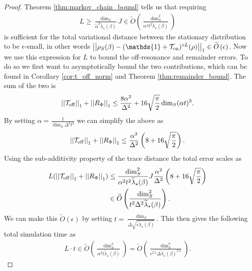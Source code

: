 \documentclass[
 amsmath,amssymb,
 aps,
onecolumn, 
nofootinbib]{revtex4-2}
\newcommand{\on}{\rm on}
\newcommand{\off}{\rm off}
\newcommand{\norm}[1]{\left|\left| #1 \right|\right|}
\newcommand{\TT}{\mathcal{T}}
\newcommand{\bigotilde}[1]{\widetilde{O} \left( #1 \right)}
\newcommand{\identity}{\mathds{1}}
\begin{document}
\begin{proof}
    Theorem \ref{thm:markov_chain_bound} tells us that requiring
    \begin{align}
        L \ge \frac{\dim_S}{\widetilde{\alpha}^2 \widetilde{\lambda}_\star(\beta)} J \in \bigotilde{\frac{\dim_S^2}{\alpha^2 t^2 \widetilde{\lambda}_\star(\beta)}}
    \end{align}
    is sufficient for the total variational distance between the stationary distribution to be $\epsilon$-small, in other words $\norm{\rho_S(\beta) - (\identity + \TT_{\on})^{\circ L}(\rho)}_1 \in \bigotilde{\epsilon}$. Now we use this expression for $L$ to bound the off-resonance and remainder errors. To do so we first want to asymptotically bound the two contributions, which can be found in Corollary \ref{cor:t_off_norm} and Theorem \ref{thm:remainder_bound}. The sum of the two is
    \begin{equation}
        \norm{\TT_{\off}}_1 + \norm{R_{\Phi}}_1 \le \frac{8 \alpha^2}{\Delta^2} + 16 \sqrt{\frac{\pi}{2}} \dim_S (\alpha t)^3.
    \end{equation}
    By setting $\alpha = \frac{1}{\dim_S \Delta^2 t^3}$ we can simplify the above as
    \begin{equation}
        \norm{\TT_{\off}}_1 + \norm{R_{\Phi}}_1 \le \frac{\alpha^2}{\Delta^2} \left(8 + 16 \sqrt{\frac{\pi}{2}} \right).
    \end{equation}
    Using the sub-additivity property of the trace distance the total error scales as
    \begin{align}
        L (\norm{\TT_{\off}}_1 + \norm{R_{\Phi}}_1) &\le \frac{\dim_S^2}{\alpha^2 t^2 \widetilde{\lambda}_\star(\beta)} J \frac{\alpha^2}{\Delta^2} \left(8 + 16 \sqrt{\frac{\pi}{2}} \right) \\
        &\in \bigotilde{\frac{\dim_S^2}{t^2 \Delta^2 \widetilde{\lambda}_\star(\beta)}}.
    \end{align}
    We can make this $\bigotilde{\epsilon}$ by setting $t = \frac{\dim_S}{\Delta \sqrt{\epsilon \widetilde{\lambda}_\star(\beta)}}$.
    This then gives the following total simulation time as
    \begin{align}
        L\cdot t \in \bigotilde{\frac{\dim_S^2}{\alpha^2 t \widetilde{\lambda}_\star(\beta)} } = \bigotilde{\frac{\dim_S^9}{\epsilon^{2.5} \Delta  \widetilde{\lambda}_\star(\beta)^{3.5}}}.
    \end{align}
    

\end{proof}
\end{document}
